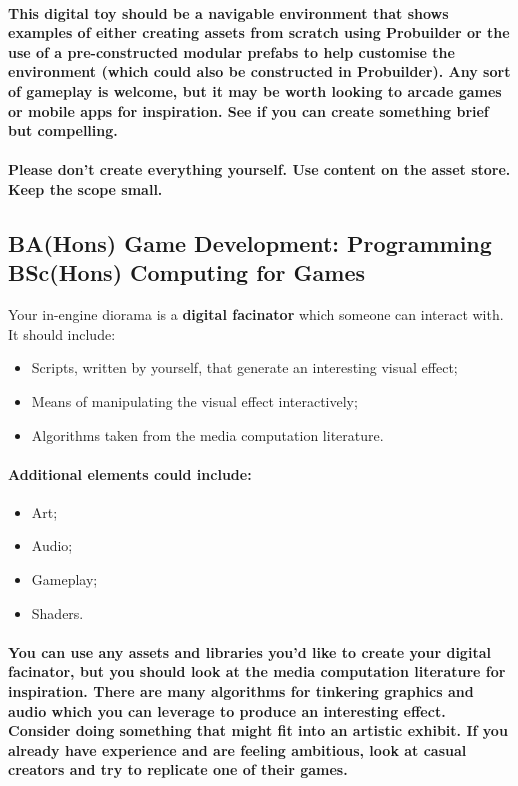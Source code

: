 \documentclass{../../fal_assignment}
\begin{document}
\paragraph{This digital toy should be a navigable environment that shows examples of either creating assets from scratch using Probuilder or the use of a pre-constructed modular prefabs to help customise the environment (which could also be constructed in Probuilder). Any sort of gameplay is welcome, but it may be worth looking to arcade games or mobile apps for inspiration. See if you can create something brief but compelling.}

\paragraph{Please don’t create everything yourself. Use content on the asset store. Keep the scope small.}

\subsection*{BA(Hons) Game Development: Programming \\ BSc(Hons) Computing for Games}

Your in-engine diorama is a \textbf{digital facinator} which someone can interact with. It should include:
\begin{itemize}
\item Scripts, written by yourself, that generate an interesting visual effect;
\item Means of manipulating the visual effect interactively; 
\item Algorithms taken from the media computation literature.
\end{itemize}
\paragraph{Additional elements could include:}
\begin{itemize}
\item Art;
\item Audio;
\item Gameplay;
\item Shaders.
\end{itemize}
\paragraph{You can use any assets and libraries you'd like to create your digital facinator, but you should look at the media computation literature for inspiration. There are many algorithms for tinkering graphics and audio which you can leverage to produce an interesting effect. Consider doing something that might fit into an artistic exhibit. If you already have experience and are feeling ambitious, look at casual creators and try to replicate one of their games.}
\end{document}
